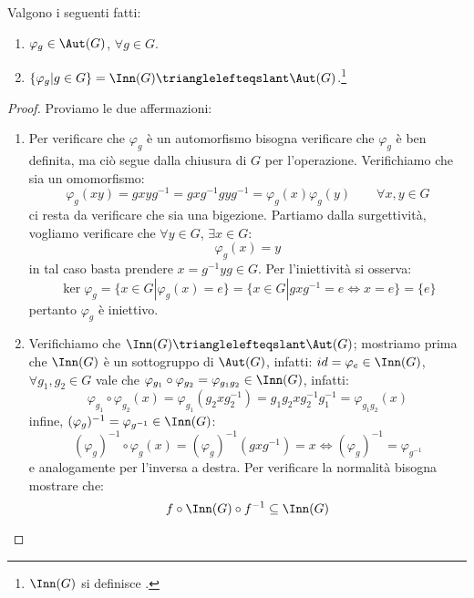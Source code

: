 \documentclass[11pt]{scrartcl}
\begin{document}
\begin{proposition}
    \label{prop1}
    Valgono i seguenti fatti:
    \begin{enumerate}[(1)]
        \item $\varphi_g \in \Aut(G)$, $\forall g \in G$.
        \item $\{\varphi_g | g \in G\} = \Inn(G) \trianglelefteqslant \Aut(G)$.\footnote{$\Inn(G)$ si definisce .}
    \end{enumerate}
\end{proposition}

\begin{proof}
    Proviamo le due affermazioni:
        \begin{enumerate}[(1)]
            \item Per verificare che $\varphi_g$ è un automorfismo bisogna verificare che $\varphi_g$ è ben definita, ma ciò segue dalla chiusura di $G$ per l'operazione.
                Verifichiamo che sia un omomorfismo:
                    \[ \varphi_g(xy) = g x y g^{-1} = gxg^{-1}gyg^{-1} = \varphi_g(x)\varphi_g(y)
                    \qquad \forall x,y \in G 
                        \]
                ci resta da verificare che sia una bigezione. Partiamo dalla surgettività, vogliamo verificare che $\forall y \in G$, $\exists x \in G :$
                    \[ \varphi_g(x) = y
                        \]
                in tal caso basta prendere $x = g^{-1}yg \in G$. Per l'iniettività si osserva:
                    \[ \ker \varphi_g = \{x \in G | \varphi_g(x) = e\} = \{x \in G | gxg^{-1} = e \iff x = e\} = \{e\}
                        \]
                pertanto $\varphi_g$ è iniettivo.
            \item Verifichiamo che $\Inn(G) \trianglelefteqslant \Aut(G)$; mostriamo prima che $\Inn(G)$ è un sottogruppo di $\Aut(G)$, infatti: 
            $id = \varphi_e \in \Inn(G)$, $\forall g_1,g_2 \in G$ vale che $\varphi_{g_{1}} \circ \varphi_{g_{2}} = \varphi_{g_1g_2} \in \Inn(G)$, infatti:
                    \[ \varphi_{g_{1}} \circ \varphi_{g_{2}}(x) = \varphi_{g_{1}}(g_2xg_2^{-1}) = g_1g_2xg_2^{-1}g_1^{-1} = \varphi_{g_1g_2}(x)
                        \]
                infine, $(\varphi_{g})^{-1} = \varphi_{g^{-1}} \in \Inn(G)$:
                    \[ (\varphi_{g})^{-1} \circ \varphi_{g}(x) = (\varphi_{g})^{-1} (gxg^{-1}) = x \iff (\varphi_{g})^{-1} = \varphi_{g^{-1}}
                        \]
                e analogamente per l'inversa a destra. Per verificare la normalità bisogna mostrare che:
                    \[ f \circ \Inn(G) \circ f^{-1} \subseteq \Inn(G)
\]
\end{enumerate}
\end{proof}
\end{document}
